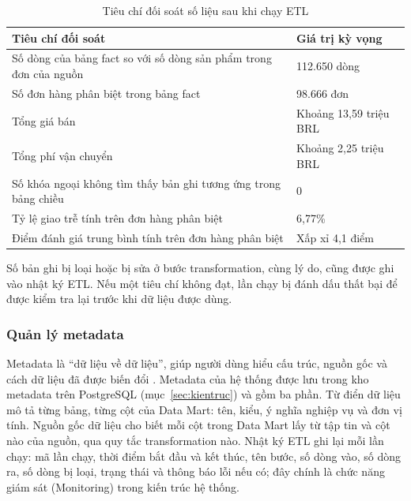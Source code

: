 \begin{table}[H]
\centering
\small{}
\caption{Tiêu chí đối soát số liệu sau khi chạy ETL}
\label{tab:doisoat}
\begin{tabularx}{\linewidth}{|>{\raggedright\arraybackslash}X|P{4.4cm}|}
\hline
\textbf{Tiêu chí đối soát} & \textbf{Giá trị kỳ vọng}\\ \hline
Số dòng của bảng fact so với số dòng sản phẩm trong đơn của nguồn & 112.650 dòng\\ \hline
Số đơn hàng phân biệt trong bảng fact & 98.666 đơn\\ \hline
Tổng giá bán & Khoảng 13,59 triệu BRL\\ \hline
Tổng phí vận chuyển & Khoảng 2,25 triệu BRL\\ \hline
Số khóa ngoại không tìm thấy bản ghi tương ứng trong bảng chiều & 0\\ \hline
Tỷ lệ giao trễ tính trên đơn hàng phân biệt & 6,77\%\\ \hline
Điểm đánh giá trung bình tính trên đơn hàng phân biệt & Xấp xỉ 4,1 điểm\\ \hline
\end{tabularx}
\end{table}

Số bản ghi bị loại hoặc bị sửa ở bước transformation, cùng lý do, cũng được ghi vào nhật ký ETL. Nếu một tiêu chí không đạt, lần chạy bị đánh dấu thất bại để được kiểm tra lại trước khi dữ liệu được dùng.

\subsubsection{Quản lý metadata}

Metadata là ``dữ liệu về dữ liệu'', giúp người dùng hiểu cấu trúc, nguồn gốc và cách dữ liệu đã được biến đổi \cite{han}. Metadata của hệ thống được lưu trong kho metadata trên PostgreSQL (mục~\ref{sec:kientruc}) và gồm ba phần. Từ điển dữ liệu mô tả từng bảng, từng cột của Data Mart: tên, kiểu, ý nghĩa nghiệp vụ và đơn vị tính. Nguồn gốc dữ liệu cho biết mỗi cột trong Data Mart lấy từ tập tin và cột nào của nguồn, qua quy tắc transformation nào. Nhật ký ETL ghi lại mỗi lần chạy: mã lần chạy, thời điểm bắt đầu và kết thúc, tên bước, số dòng vào, số dòng ra, số dòng bị loại, trạng thái và thông báo lỗi nếu có; đây chính là chức năng giám sát (Monitoring) trong kiến trúc hệ thống.
